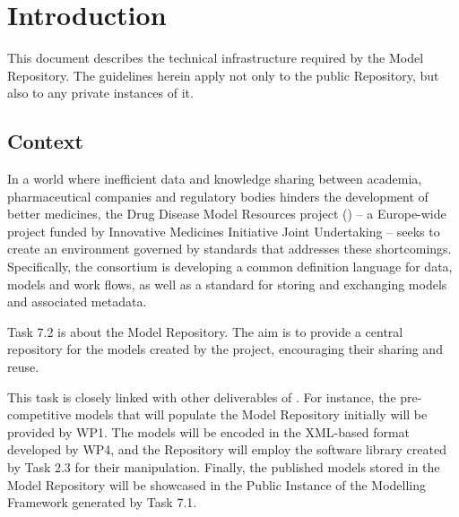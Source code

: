 \section{Introduction}
\label{introduction}
This document describes the technical infrastructure required by the \ddmore Model Repository. The guidelines herein apply not only to the public Repository, but also to any private instances of it.

\subsection{Context}
\label{context}
In a world where inefficient data and knowledge sharing between academia, pharmaceutical companies and regulatory bodies hinders the development of better medicines, the Drug Disease Model Resources project (\ddmore) -- a Europe-wide project funded by Innovative Medicines Initiative Joint Undertaking -- seeks to create an environment governed by standards that addresses these shortcomings. Specifically, the \ddmore consortium is developing a common definition language for data, models and work flows, as well as a standard for storing and exchanging \glspl{model} and associated metadata\cite{ddmore:dow}.

Task 7.2 is about the \ddmore Model Repository. The aim is to provide a central repository for the models created by the project, encouraging their sharing and reuse.

This task is closely linked with other deliverables of \ddmore. For instance, the pre-competitive models that will populate the Model Repository initially will be provided by WP1. The models will be encoded in the XML-based format developed by WP4, and the Repository will employ the software library created by Task 2.3 for their manipulation. Finally, the published models stored in the \ddmore Model Repository will be showcased in the Public Instance of the Modelling Framework generated by Task 7.1.

